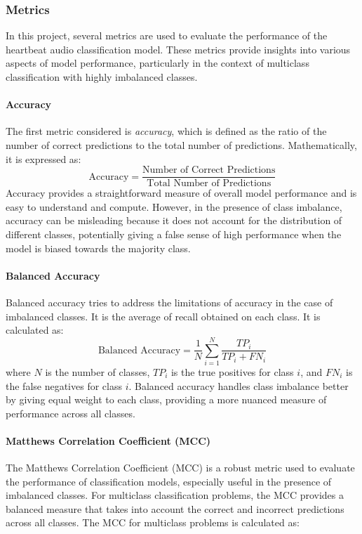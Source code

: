 \subsubsection*{Metrics}

In this project, several metrics are used to evaluate the performance of the heartbeat audio classification model.
These metrics provide insights into various aspects of model performance,
particularly in the context of multiclass classification with highly imbalanced classes.

\paragraph{Accuracy}
The first metric considered is \textit{accuracy}, which is defined as the ratio of the number
of correct predictions to the total number of predictions. Mathematically, it is expressed as:
\[
    \text{Accuracy} = \frac{\text{Number of Correct Predictions}}{\text{Total Number of Predictions}}
\]
Accuracy provides a straightforward measure of overall model performance and is easy to understand and compute.
However, in the presence of class imbalance, accuracy can be misleading because it does not account for the distribution of different classes,
potentially giving a false sense of high performance when the model is biased towards the majority class.

\paragraph{Balanced Accuracy}
Balanced accuracy tries to address the limitations of accuracy in the case of imbalanced classes.
It is the average of recall obtained on each class. It is calculated as:
\[
    \text{Balanced Accuracy} = \frac{1}{N} \sum_{i=1}^{N} \frac{TP_i}{TP_i + FN_i}
\]
where \(N\) is the number of classes, \(TP_i\) is the true positives for class \(i\), and \(FN_i\)
is the false negatives for class \(i\). Balanced accuracy handles class imbalance better by giving equal weight to each class,
providing a more nuanced measure of performance across all classes.

\paragraph{Matthews Correlation Coefficient (MCC)}

The Matthews Correlation Coefficient (MCC) is a robust metric used to evaluate the performance of classification models,
especially useful in the presence of imbalanced classes. For multiclass classification problems, the MCC provides a balanced measure that takes
into account the correct and incorrect predictions across all classes. The MCC for multiclass problems is calculated as:


